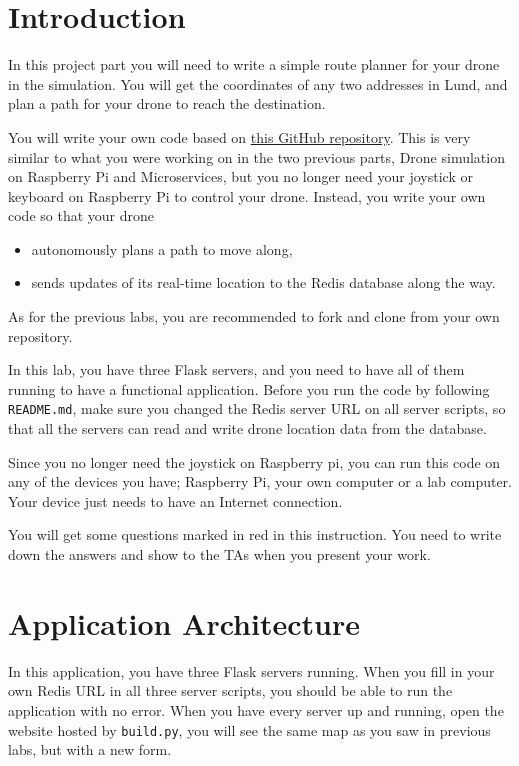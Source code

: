 \documentclass{article}
\begin{document}
\section{Introduction}
In this project part you will need to write a simple route planner for your drone in the simulation. You will get the coordinates of any two addresses in Lund, and plan a path for your drone to reach the destination. 

You will write your own code based on {\color{blue}\href{https://github.com/HaoruiPeng/InfoCom-LP2-Lab3}{this GitHub repository}}. This is very similar to what you were working on in the two previous parts, Drone simulation on Raspberry Pi and Microservices, but you no longer need your joystick or keyboard on Raspberry Pi to control your drone. Instead, you write your own code so that your drone
\begin{itemize}
    \item autonomously plans a path to move along,
    \item sends updates of its real-time location to the Redis database along the way.
\end{itemize}
As for the previous labs, you are recommended to fork and clone from your own repository.

In this lab, you have three Flask servers, and you need to have all of them running to have a functional application. Before you run the code by following \verb!README.md!, make sure you changed the Redis server URL on all server scripts, so that all the servers can read and write drone location data from the database.

Since you no longer need the joystick on Raspberry pi, you can run this code on any of the devices you have; Raspberry Pi, your own computer or a lab computer. Your device just needs to have an Internet connection.\vspace{0.3cm}

\parbox[t]{14cm}{{You will get some questions marked in red in this instruction. You need to write down the answers and show to the TAs when you present your work.}}\vspace{0.2cm}

\section{Application Architecture}

In this application, you have three Flask servers running. When you fill in your own Redis URL in all three server scripts, you should be able to run the application with no error. When you have every server up and running, open the website hosted by \verb!build.py!, you will see the same map as you saw in previous labs, but with a new form.
\end{document}
